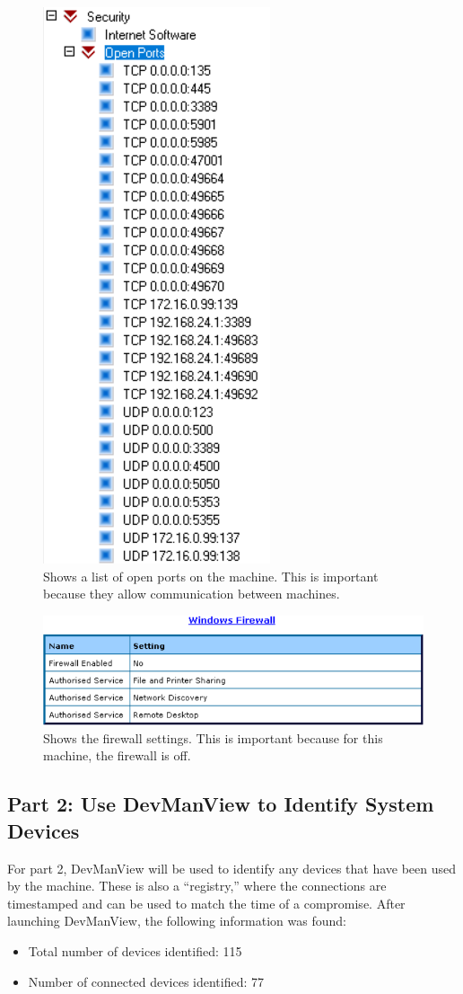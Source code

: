 \begin{figure}[H]
    \centering
    \includegraphics[width=0.35\linewidth]{figures/pic16.png}
    \caption{Shows a list of open ports on the machine. This is important because they allow communication between machines.}
\end{figure}

\begin{figure}[H]
    \centering
    \includegraphics[width=0.8\linewidth]{figures/pic17.png}
    \caption{Shows the firewall settings. This is important because for this machine, the firewall is off.}
\end{figure}

\subsection{Part 2: Use DevManView to Identify System Devices}
For part 2, DevManView will be used to identify any devices that have been used by the machine. These is also a “registry,” where the connections are timestamped and can be used to match the time of a compromise. After launching DevManView, the following information was found:
\begin{itemize}
    \item Total number of devices identified: 115
    \item Number of connected devices identified: 77
\end{itemize}


